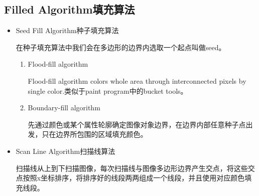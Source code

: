 \documentclass[UTF8]{ctexart}
\begin{document}
\subsection{Filled Algorithm填充算法}
\begin{itemize}
    \item Seed Fill Algorithm种子填充算法
    
    在种子填充算法中我们会在多边形的边界内选取一个起点叫做seed。
    \begin{enumerate}
        \item Flood-fill algorithm
        
        Flood-fill algorithm colors whole area through interconnected pixels by single color.类似于paint program中的bucket tools。
        \item Boundary-fill algorithm 
        
        先通过颜色或某个属性轮廓确定图像对象边界，在边界内部任意种子点出发，只在边界所包围的区域填充颜色。
    \end{enumerate}
    \item Scan Line Algorithm扫描线算法
    
    扫描线从上到下扫描图像，每次扫描线与图像多边形边界产生交点，将这些交点按照x坐标排序，将排序好的线段两两组成一个线段，并且使用对应颜色填充线段。
    
\end{itemize}
\end{document}
